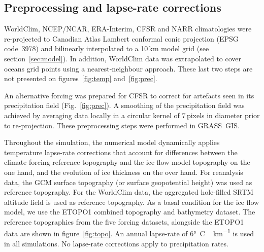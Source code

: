 
\subsection{Preprocessing and lapse-rate corrections}

WorldClim, NCEP/NCAR, ERA-Interim, CFSR and NARR climatologies were re-projected to Canadian Atlas Lambert conformal conic projection (EPSG code~3978) and bilinearly interpolated to a 10\,km model grid (see section~\ref{sec:model}). In addition, WorldClim data was extrapolated to cover oceans grid points using a nearest-neighbour approach. These last two steps are not presented on figures~\ref{fig:temp} and~\ref{fig:prec}.

An alternative forcing was prepared for CFSR to correct for artefacts seen in its precipitation field (Fig.~\ref{fig:prec}). A smoothing of the precipitation field was achieved by averaging data locally in a circular kernel of 7\,pixels in diameter prior to re-projection. These preprocessing steps were performed in GRASS~GIS.

Throughout the simulation, the numerical model dynamically applies temperature lapse-rate corrections that account for differences between the climate forcing reference topography and the ice flow model topography on the one hand, and the evolution of ice thickness on the over hand. For reanalysis data, the GCM surface topography (or surface geopotential height) was used as reference topography. For the WorldClim data, the aggregated hole-filled SRTM altitude field is used as reference topography. As a basal condition for the ice flow model, we use the ETOPO1\citep{data:etopo1} combined topography and bathymetry dataset. The reference topographies from the five forcing datasets, alongside the ETOPO1 data are shown in figure~\ref{fig:topo}. An annual lapse-rate of 6\unit{\degree C\,km^{-1}} is used in all simulations. No lapse-rate corrections apply to precipitation rates.

